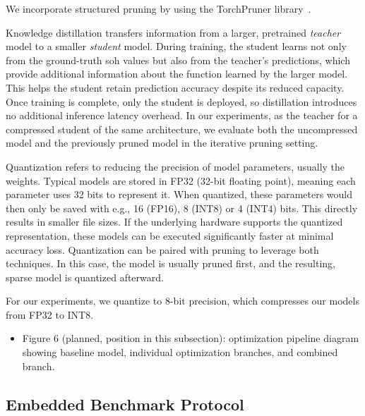 \documentclass[final,3p,times]{elsarticle}
\begin{document}
We incorporate structured pruning by using the TorchPruner library~\cite{torchpruner}.

Knowledge distillation transfers information from a larger, pretrained \textit{teacher} model to a smaller \textit{student} model. During training, the student learns not only from the ground-truth \ac{soh} values but also from the teacher's predictions, which provide additional information about the function learned by the larger model. This helps the student retain prediction accuracy despite its reduced capacity. Once training is complete, only the student is deployed, so distillation introduces no additional inference latency overhead. In our experiments, as the teacher for a compressed student of the same architecture, we evaluate both the uncompressed model and the previously pruned model in the iterative pruning setting.



Quantization refers to reducing the precision of model parameters, usually the weights. Typical models are stored in FP32 (32-bit floating point), meaning each parameter uses 32 bits to represent it. When quantized, these parameters would then only be saved with e.g., 16 (FP16), 8 (INT8) or 4 (INT4) bits. This directly results in smaller file sizes. If the underlying hardware supports the quantized representation, these models can be executed significantly faster at minimal accuracy loss. Quantization can be paired with pruning to leverage both techniques. In this case, the model is usually pruned first, and the resulting, sparse model is quantized afterward.

For our experiments, we quantize to 8-bit precision, which compresses our models from FP32 to INT8.

\begin{itemize}[leftmargin=*]


\item Figure 6 (planned, position in this subsection): optimization pipeline diagram showing baseline model, individual optimization branches, and combined branch.
\end{itemize}

\subsection{Embedded Benchmark Protocol}
\end{document}
